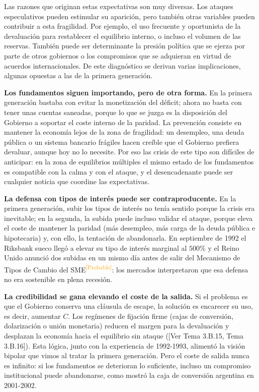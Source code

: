 \documentclass[10pt,a4paper]{article}
\newcommand{\authorfont}[1]{{\fontfamily{EBGaramond-TLF}\selectfont #1}}
\begin{document}
Las razones que originan estas expectativas son muy diversas. Los ataques especulativos pueden estimular su aparición, pero también otras variables pueden contribuir a esta fragilidad. Por ejemplo, el uso frecuente y oportunista de la devaluación para restablecer el equilibrio interno, o incluso el volumen de las reservas. También puede ser determinante la presión política que se ejerza por parte de otros gobiernos o los compromisos que se adquieran en virtud de acuerdos internacionales. De este diagnóstico se derivan varias implicaciones, algunas opuestas a las de la primera generación.

\textbf{Los fundamentos siguen importando, pero de otra forma.} En la primera generación bastaba con evitar la monetización del déficit; ahora no basta con tener unas cuentas saneadas, porque lo que se juzga es la disposición del Gobierno a soportar el coste interno de la paridad. La prevención consiste en mantener la economía lejos de la zona de fragilidad: un desempleo, una deuda pública o un sistema bancario frágiles hacen creíble que el Gobierno prefiera devaluar, aunque hoy no lo necesite. Por eso las crisis de este tipo son difíciles de anticipar: en la zona de equilibrios múltiples el mismo estado de los fundamentos es compatible con la calma y con el ataque, y el desencadenante puede ser cualquier noticia que coordine las expectativas.

\textbf{La defensa con tipos de interés puede ser contraproducente.} En la primera generación, subir los tipos de interés no tenía sentido porque la crisis era inevitable; en la segunda, la subida puede incluso validar el ataque, porque eleva el coste de mantener la paridad (más desempleo, más carga de la deuda pública e hipotecaria) y, con ello, la tentación de abandonarla. En septiembre de 1992 el Riksbank sueco llegó a elevar su tipo de interés marginal al $500\%$ y el Reino Unido anunció dos subidas en un mismo día antes de salir del Mecanismo de Tipos de Cambio del SME\textcolor{orange}{\textsuperscript{[Probable]}}: los mercados interpretaron que esa defensa no era sostenible en plena recesión.

\textbf{La credibilidad se gana elevando el coste de la salida.} Si el problema es que el Gobierno conserva una cláusula de escape, la solución es encarecer su uso, es decir, aumentar $C$. Los regímenes de fijación firme (cajas de conversión, dolarización o unión monetaria) reducen el margen para la devaluación y desplazan la economía hacia el equilibrio sin ataque ([\authorfont{Ver Tema 3.B.15, Tema 3.B.16}]). Esta lógica, junto con la experiencia de 1992-1993, alimentó la visión bipolar que vimos al tratar la primera generación. Pero el coste de salida nunca es infinito: si los fundamentos se deterioran lo suficiente, incluso un compromiso institucional puede abandonarse, como mostró la caja de conversión argentina en 2001-2002.
\end{document}
